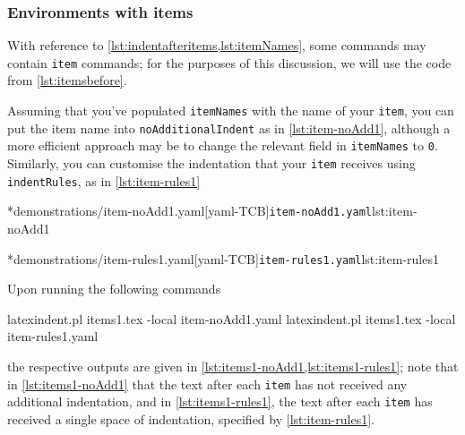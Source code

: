 \subsubsection{Environments with items}
	With reference to \vref{lst:indentafteritems,lst:itemNames}, some commands may contain \texttt{item} commands; for the purposes of this discussion, we will use the code from \vref{lst:itemsbefore}.

	Assuming that you've populated \texttt{itemNames} with the name of your \texttt{item}, you can put the item name into \texttt{noAdditionalIndent} as in \cref{lst:item-noAdd1}, although a more efficient approach may be to change the relevant field in \texttt{itemNames} to \texttt{0}.
	Similarly, you can customise the indentation that your \texttt{item} receives using \texttt{indentRules}, as in \cref{lst:item-rules1} 

	\begin{minipage}{.45\textwidth}
		\cmhlistingsfromfile[style=yaml-LST]*{demonstrations/item-noAdd1.yaml}[yaml-TCB]{\texttt{item-noAdd1.yaml}}{lst:item-noAdd1}
	\end{minipage} \hfill
	\begin{minipage}{.45\textwidth}
		\cmhlistingsfromfile[style=yaml-LST]*{demonstrations/item-rules1.yaml}[yaml-TCB]{\texttt{item-rules1.yaml}}{lst:item-rules1}
	\end{minipage} 

	Upon running the following commands \begin{commandshell}
latexindent.pl items1.tex -local item-noAdd1.yaml  
latexindent.pl items1.tex -local item-rules1.yaml  
\end{commandshell} the respective outputs are given in \cref{lst:items1-noAdd1,lst:items1-rules1}; note that in \cref{lst:items1-noAdd1} that the text after each \texttt{item} has not received any additional indentation, and in \cref{lst:items1-rules1}, the text after each \texttt{item} has received a single space of indentation, specified by \cref{lst:item-rules1}.

	\begin{minipage}{.45\textwidth}
	\end{minipage}
	\hfill
	\begin{minipage}{.45\textwidth}
	\end{minipage}

